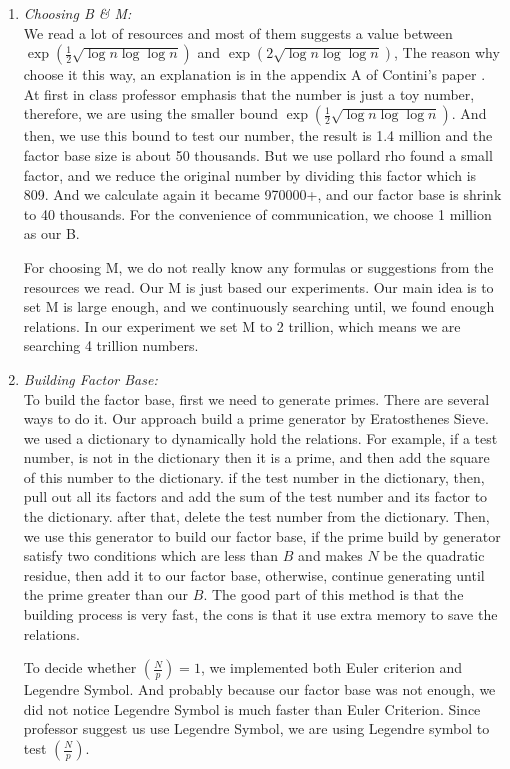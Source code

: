 \documentclass[12pt]{article} %
\newcommand{\itemgap}[1][2]{\vspace{#1mm}}
\newcommand{\legendre}[2]{\left(\frac{#1}{#2}\right)}
\begin{document}
\renewcommand\labelenumi{\Roman{enumi}}
\begin{enumerate}
\item \textit{Choosing B \& M:} \itemgap
\\ We read a lot of resources and most of them suggests a value between $\exp{(\frac{1}{2}\sqrt{\log{n}\log{\log{n}}})}$ and $\exp{(2\sqrt{\log{n}\log{\log{n}}})}$, The reason why choose it this way, an explanation is in the appendix A of Contini's paper \cite{contini}. At first in class professor emphasis that the number is just a toy number, therefore, we are using the smaller bound $\exp{(\frac{1}{2}\sqrt{\log{n}\log{\log{n}}})}$. And then, we use  this bound to test our number, the result is 1.4 million and the factor base size is about 50 thousands. But we use pollard rho found a small factor, and we reduce the original number by dividing this factor which is 809. And we calculate again it became 970000+, and our factor base is shrink to 40 thousands. For the convenience of communication, we choose 1 million as our B. 

For choosing M, we do not really know any formulas or suggestions from the resources we read. Our M is just based our experiments. Our main idea is to set M is large enough, and we continuously searching until, we found enough relations. In our experiment we set M to 2 trillion, which means we are searching 4 trillion numbers.

\item \textit{Building Factor Base:} \itemgap
\\ To build the factor base, first we need to generate primes. There are several ways to do it. Our approach build a prime generator by Eratosthenes Sieve. we used a dictionary to dynamically hold the relations. For example, if a test number, is not in the dictionary then it is a prime, and then add the square of this number to the dictionary. if the test number in the dictionary, then, pull out all its factors and add the sum of the test number and its factor to the dictionary. after that, delete the test number from the dictionary. Then, we use this generator to build our factor base, if the prime build by generator satisfy two conditions which are less than $B$ and makes $N$ be the quadratic residue, then add it to our factor base, otherwise, continue generating until the prime greater than our $B$. The good part of this method is that the building process is very fast, the cons is that it use extra memory to save the relations.

To decide whether $\legendre{N}{p} = 1$, we implemented both Euler criterion and Legendre Symbol. And probably because our factor base was not enough, we did not notice Legendre Symbol is much faster than Euler Criterion. Since professor suggest us use Legendre Symbol, we are using Legendre symbol to test $\legendre{N}{p}$.


\end{enumerate}
\end{document}
